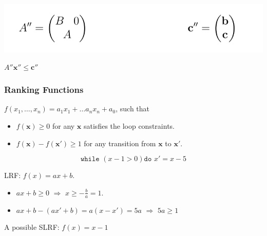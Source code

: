 \documentclass[11pt]{beamer}
\begin{document}
\begin{frame}
{\begin{definition}[SLC]
\end{definition}
\begin{center}
\includegraphics[scale = 0.25]{2.PNG}

$A''\textbf{x}'' \le \textbf{c}''$
\end{center}
}
\end{frame}
\begin{frame}\frametitle{Ranking Functions}

\begin{definition}

$f(x_1, \ldots, x_n) = a_1x_1 + \ldots a_nx_n + a_0$, such that

\begin{itemize}
\item $f(\textbf{x}) \ge 0$ for any $\textbf{x}$ satisfies the loop constraints.

\item $f(\textbf{x}) - f(\textbf{x}') \ge 1$ for any transition from $\textbf{x}$ to $\textbf{x}'$.



\end{itemize}
\end{definition}

\begin{example}
\[\texttt{while }( x - 1 > 0) \texttt{do } x' = x - 5\]

LRF: $f(x) = ax + b$.
\begin{itemize}
\item $ax + b \ge 0$ $\Rightarrow$ $x \ge -\frac{b}{a} = 1$.
\item $ax + b - (ax' + b) = a(x - x') = 5a$ $\Rightarrow$ $5a \ge 1$
\end{itemize}
A possible SLRF: $f(x) = x - 1$
\end{example}

\end{frame}
\end{document}
